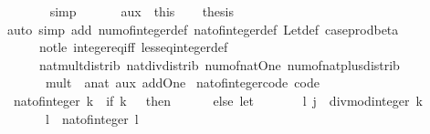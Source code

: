 \begin{isabellebody}
\ \ \ \ \ \ \isamarkupfalse%
\ simp\isanewline
\ \ \isacommand{{\isacharbraceright}{\kern0pt}}\isamarkupfalse%
\isanewline
\ \ \isamarkupfalse%
\ aux\ {\isacharequal}{\kern0pt}\ this\isanewline
\ \ \isamarkupfalse%
\ {\isacharquery}{\kern0pt}thesis\isanewline
\ \ \ \ \isamarkupfalse%
\ {\isacharparenleft}{\kern0pt}auto\ simp\ add{\isacharcolon}{\kern0pt}\ num{\isacharunderscore}{\kern0pt}of{\isacharunderscore}{\kern0pt}integer{\isacharunderscore}{\kern0pt}def\ nat{\isacharunderscore}{\kern0pt}of{\isacharunderscore}{\kern0pt}integer{\isacharunderscore}{\kern0pt}def\ Let{\isacharunderscore}{\kern0pt}def\ case{\isacharunderscore}{\kern0pt}prod{\isacharunderscore}{\kern0pt}beta\isanewline
\ \ \ \ \ \ not{\isacharunderscore}{\kern0pt}le\ integer{\isacharunderscore}{\kern0pt}eq{\isacharunderscore}{\kern0pt}iff\ less{\isacharunderscore}{\kern0pt}eq{\isacharunderscore}{\kern0pt}integer{\isacharunderscore}{\kern0pt}def\isanewline
\ \ \ \ \ \ nat{\isacharunderscore}{\kern0pt}mult{\isacharunderscore}{\kern0pt}distrib\ nat{\isacharunderscore}{\kern0pt}div{\isacharunderscore}{\kern0pt}distrib\ num{\isacharunderscore}{\kern0pt}of{\isacharunderscore}{\kern0pt}nat{\isacharunderscore}{\kern0pt}One\ num{\isacharunderscore}{\kern0pt}of{\isacharunderscore}{\kern0pt}nat{\isacharunderscore}{\kern0pt}plus{\isacharunderscore}{\kern0pt}distrib\isanewline
\ \ \ \ \ \ \ mult{\isacharunderscore}{\kern0pt}{}\ {\isacharbrackleft}{\kern0pt}\ {\isacharprime}{\kern0pt}a{\isacharequal}{\kern0pt}nat{\isacharbrackright}{\kern0pt}\ aux\ add{\isacharunderscore}{\kern0pt}One{\isacharparenright}{\kern0pt}\isanewline
{}\isamarkupfalse%
%
\endisatagproof
{\isafoldproof}%
%
\isadelimproof
\isanewline
%
\endisadelimproof
\isanewline
{}\isamarkupfalse%
\ nat{\isacharunderscore}{\kern0pt}of{\isacharunderscore}{\kern0pt}integer{\isacharunderscore}{\kern0pt}code\ {\isacharbrackleft}{\kern0pt}code{\isacharbrackright}{\kern0pt}{\isacharcolon}{\kern0pt}\isanewline
\ \ {\isachardoublequoteopen}nat{\isacharunderscore}{\kern0pt}of{\isacharunderscore}{\kern0pt}integer\ k\ {\isacharequal}{\kern0pt}\ {\isacharparenleft}{\kern0pt}if\ k\ {\isasymle}\ {}\ then\ {}\isanewline
\ \ \ \ \ else\ let\isanewline
\ \ \ \ \ \ \ {\isacharparenleft}{\kern0pt}l{\isacharcomma}{\kern0pt}\ j{\isacharparenright}{\kern0pt}\ {\isacharequal}{\kern0pt}\ divmod{\isacharunderscore}{\kern0pt}integer\ k\ {}{\isacharsemicolon}{\kern0pt}\isanewline
\ \ \ \ \ \ \ l{\isacharprime}{\kern0pt}\ {\isacharequal}{\kern0pt}\ nat{\isacharunderscore}{\kern0pt}of{\isacharunderscore}{\kern0pt}integer\ l{\isacharsemicolon}{\kern0pt}\isanewline

\end{isabellebody}
